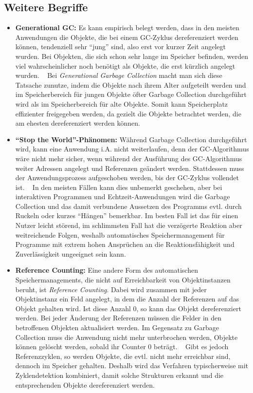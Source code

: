 \documentclass[]{article}
\begin{document}
\hypertarget{weitere-begriffe}{%
\subsection{Weitere Begriffe}\label{weitere-begriffe}}

\begin{itemize}
\item
  \textbf{Generational GC:} Es kann empirisch belegt werden, dass in den
  meisten Anwendungen die Objekte, die bei einem GC-Zyklus
  dereferenziert werden können, tendenziell sehr ``jung'' sind, also
  erst vor kurzer Zeit angelegt wurden. Bei Objekten, die sich schon
  sehr lange im Speicher befinden, werden viel wahrscheinlicher noch
  benötigt als Objekte, die erst kürzlich angelegt wurden. ~ Bei
  \emph{Generational Garbage Collection} macht man sich diese Tatsache
  zunutze, indem die Objekte nach ihrem Alter aufgeteilt werden und im
  Speicherbereich für jungen Objekte öfter Garbage Collection
  durchgeführt wird als im Speicherbereich für alte Objekte. Somit kann
  Speicherplatz effizienter freigegeben werden, da gezielt die Objekte
  betrachtet werden, die am ehesten dereferenziert werden können.
\item
  \textbf{``Stop the World''-Phänomen:} Während Garbage Collection
  durchgeführt wird, kann eine Anwendung i.A. nicht weiterlaufen, denn
  der GC-Algorithmus wäre nicht mehr sicher, wenn während der Ausführung
  des GC-Algorithmus weiter Adressen angelegt und Referenzen geändert
  werden. Stattdessen muss der Anwendungsprozess aufgeschoben werden,
  bis der GC-Zyklus vollendet ist. ~ In den meisten Fällen kann dies
  unbemerkt geschehen, aber bei interaktiven Programmen und
  Echtzeit-Anwendungen wird die Garbage Collection und das damit
  verbundene Aussetzen des Programms evtl. durch Ruckeln oder kurzes
  ``Hängen'' bemerkbar. Im besten Fall ist das für einen Nutzer leicht
  störend, im schlimmsten Fall hat die verzögerte Reaktion aber
  weitreichende Folgen, weshalb automatisches Speichermanagement für
  Programme mit extrem hohen Ansprüchen an die Reaktionsfähigkeit und
  Zuverlässigkeit ungeeignet sein kann.
\item
  \textbf{Reference Counting:} Eine andere Form des automatischen
  Speichermanagements, die nicht auf Erreichbarkeit von Objektinstanzen
  beruht, ist \emph{Reference Counting}. Dabei wird zusammen mit jeder
  Objektinstanz ein Feld angelegt, in dem die Anzahl der Referenzen auf
  das Objekt gehalten wird. Ist diese Anzahl 0, so kann das Objekt
  dereferenziert werden. Bei jeder Änderung der Referenzen müssen die
  Felder in den betroffenen Objekten aktualisiert werden. Im Gegensatz
  zu Garbage Collection muss die Anwendung nicht mehr unterbrochen
  werden, Objekte können gelöscht werden, sobald ihr Counter 0 beträgt.
  ~ Gibt es jedoch Referenzzyklen, so werden Objekte, die evtl. nicht
  mehr erreichbar sind, dennoch im Speicher gehalten. Deshalb wird das
  Verfahren typischerweise mit Zyklendetektion kombiniert, damit solche
  Strukturen erkannt und die entsprechenden Objekte dereferenziert
  werden.
\end{itemize}
\end{document}
